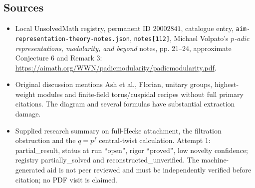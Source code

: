 \documentclass[11pt]{article}
\begin{document}
\subsection{Sources}
\begin{itemize}
\item Local UnsolvedMath registry, permanent ID \(20002841\), catalogue entry, \texttt{aim-representation-theory-notes.json}, \texttt{notes[112]}, Michael Volpato's \emph{\(p\)-adic representations, modularity, and beyond} notes, pp. 21--24, approximate Conjecture 6 and Remark 3: \url{https://aimath.org/WWN/padicmodularity/padicmodularity.pdf}.
\item Original discussion mentions Ash et al., Florian, unitary groups, highest-weight modules and finite-field torus/cuspidal recipes without full primary citations. The diagram and several formulas have substantial extraction damage.
\item Supplied research summary on full-Hecke attachment, the filtration obstruction and the \(q=p^f\) central-twist calculation. Attempt 1: partial\_result, status at run ``open'', rigor ``proved'', low novelty confidence; registry partially\_solved and reconstructed\_unverified. The machine-generated aid is not peer reviewed and must be independently verified before citation; no PDF visit is claimed.
\end{itemize}
\end{document}
